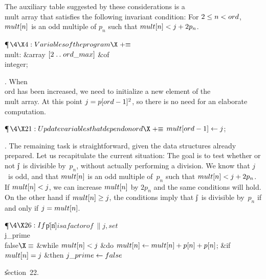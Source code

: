 The auxiliary table suggested by these considerations is a \\{mult}
array that satisfies the following invariant condition: For $2\L\|n<\\{ord}$,
$\\{mult}[\|n]$ is an odd multiple of $p_n$ such that $\\{mult}[n]<j+2p_n$.

\Y\P$\4\X4:Variables of the program\X\mathrel{+}\S$\6
\4\\{mult}: \&{array} $[2\to\\{ord\_max}]$ \1\&{of}\5
\\{integer};\2\par
\fi

. When \\{ord} has been increased, we need to initialize a new element of
the \\{mult} array. At this point $j=p[\\{ord}-1]^2$, so there is no
need for an elaborate computation.

\Y\P$\4\X21:Update variables that depend on~\\{ord}\X\mathrel{+}\S$\6
$\\{mult}[\\{ord}-1]\K\|j$;\par
\fi

. The remaining task is straightforward, given the data structures
already prepared. Let us recapitulate the current situation: The
goal is to test whether or not \|j~is divisible by~$p_n$, without
actually performing a division. We know that $j$~is odd, and that
$\\{mult}[\|n]$ is an odd multiple of~$p_n$ such that $\\{mult}[n]<j+2p_n$.
If $\\{mult}[\|n]<\|j$, we can increase $\\{mult}[\|n]$ by $2p_n$ and the same
conditions will hold. On the other hand if $\\{mult}[\|n]\G\|j$, the
conditions imply that \|j~is divisible by~$p_n$ if and only if
$\|j=\\{mult}[\|n]$.

\Y\P$\4\X26:If $\|p[\|n]$ is a factor of~\|j, set $\\{j\_prime}\K\\{false}$\X%
\S$\6
\&{while} $\\{mult}[\|n]<\|j$ \1\&{do}\5
$\\{mult}[\|n]\K\\{mult}[\|n]+\|p[\|n]+\|p[\|n]$;\2\6
\&{if} $\\{mult}[\|n]=\|j$ \1\&{then}\5
$\\{j\_prime}\K\\{false}$\2\par
\U section~22.\fi



